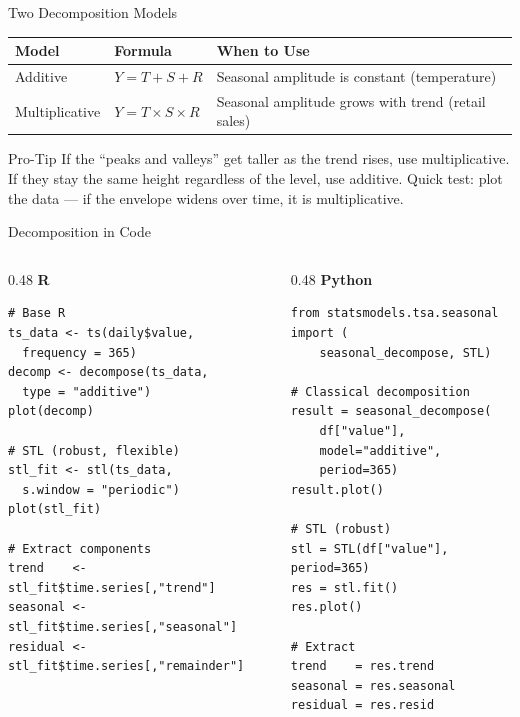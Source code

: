 \documentclass[10pt]{beamer}
\begin{document}
\begin{frame}{Two Decomposition Models}
  \centering
  \begin{tabular}{llp{4.5cm}}
    \toprule
    \textbf{Model} & \textbf{Formula} & \textbf{When to Use} \\
    \midrule
    Additive & $Y = T + S + R$ & Seasonal amplitude is constant (temperature) \\
    Multiplicative & $Y = T \times S \times R$ & Seasonal amplitude grows with trend (retail sales) \\
    \bottomrule
  \end{tabular}
  \vspace{8pt}
  \begin{alertblock}{Pro-Tip}
    If the ``peaks and valleys'' get taller as the trend rises, use
    multiplicative. If they stay the same height regardless of the
    level, use additive. Quick test: plot the data --- if the envelope
    widens over time, it is multiplicative.
  \end{alertblock}
\end{frame}

\begin{frame}[fragile]{Decomposition in Code}
  \begin{columns}[T]
    \begin{column}{0.48\textwidth}
      \textbf{R}
\begin{lstlisting}[style=rstyle]
# Base R
ts_data <- ts(daily$value,
  frequency = 365)
decomp <- decompose(ts_data,
  type = "additive")
plot(decomp)

# STL (robust, flexible)
stl_fit <- stl(ts_data,
  s.window = "periodic")
plot(stl_fit)

# Extract components
trend    <- stl_fit$time.series[,"trend"]
seasonal <- stl_fit$time.series[,"seasonal"]
residual <- stl_fit$time.series[,"remainder"]
\end{lstlisting}
    \end{column}
    \begin{column}{0.48\textwidth}
      \textbf{Python}
\begin{lstlisting}[style=pythonstyle]
from statsmodels.tsa.seasonal import (
    seasonal_decompose, STL)

# Classical decomposition
result = seasonal_decompose(
    df["value"],
    model="additive",
    period=365)
result.plot()

# STL (robust)
stl = STL(df["value"], period=365)
res = stl.fit()
res.plot()

# Extract
trend    = res.trend
seasonal = res.seasonal
residual = res.resid
\end{lstlisting}
    \end{column}
  \end{columns}
\end{frame}
\end{document}
